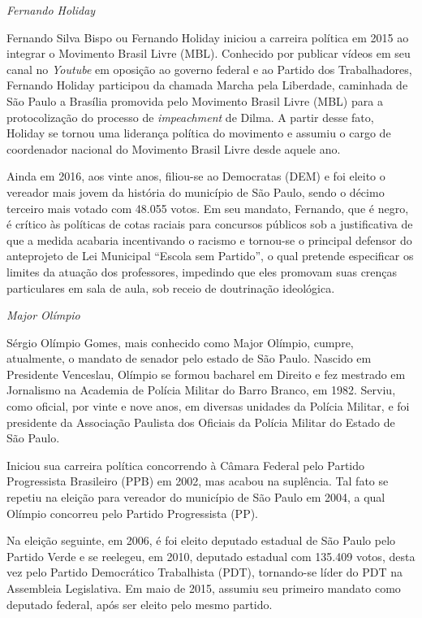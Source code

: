 \emph{Fernando Holiday}

Fernando Silva Bispo ou Fernando Holiday iniciou a carreira política em
2015 ao integrar o Movimento Brasil Livre (MBL). Conhecido por publicar
vídeos em seu canal no \emph{Youtube} em oposição ao governo federal e
ao Partido dos Trabalhadores, Fernando Holiday participou da chamada
Marcha pela Liberdade, caminhada de São Paulo a Brasília promovida pelo
Movimento Brasil Livre (MBL) para a protocolização do processo de
\emph{impeachment} de Dilma. A partir desse fato, Holiday se tornou uma
liderança política do movimento e assumiu o cargo de coordenador
nacional do Movimento Brasil Livre desde aquele ano.

Ainda em 2016, aos vinte anos, filiou-se ao Democratas (DEM) e foi
eleito o vereador mais jovem da história do município de São Paulo,
sendo o décimo terceiro mais votado com 48.055 votos. Em seu mandato,
Fernando, que é negro, é crítico às políticas de cotas raciais para
concursos públicos sob a justificativa de que a medida acabaria
incentivando o racismo e tornou-se o principal defensor do anteprojeto
de Lei Municipal ``Escola sem Partido'', o qual pretende especificar os
limites da atuação dos professores, impedindo que eles promovam suas
crenças particulares em sala de aula, sob receio de doutrinação
ideológica.

\emph{Major Olímpio}

Sérgio Olímpio Gomes, mais conhecido como Major Olímpio, cumpre,
atualmente, o mandato de senador pelo estado de São Paulo. Nascido em
Presidente Venceslau, Olímpio se formou bacharel em Direito e fez
mestrado em Jornalismo na Academia de Polícia Militar do Barro Branco,
em 1982. Serviu, como oficial, por vinte e nove anos, em diversas
unidades da Polícia Militar, e foi presidente da Associação Paulista dos
Oficiais da Polícia Militar do Estado de São Paulo.

Iniciou sua carreira política concorrendo à Câmara Federal pelo Partido
Progressista Brasileiro (PPB) em 2002, mas acabou na suplência. Tal fato
se repetiu na eleição para vereador do município de São Paulo em 2004, a
qual Olímpio concorreu pelo Partido Progressista (PP).

Na eleição seguinte, em 2006, é foi eleito deputado estadual de São
Paulo pelo Partido Verde e se reelegeu, em 2010, deputado estadual com
135.409 votos, desta vez pelo Partido Democrático Trabalhista (PDT),
tornando-se líder do PDT na Assembleia Legislativa. Em maio de 2015,
assumiu seu primeiro mandato como deputado federal, após ser eleito pelo
mesmo partido.

